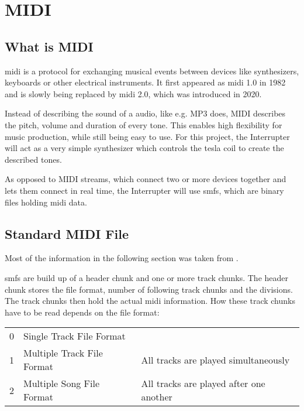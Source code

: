 \setchapterpreamble[u]{\margintoc}

\chapter{MIDI}

\section{What is MIDI}

\gls{midi} is a protocol for exchanging musical events between devices like synthesizers, keyboards or other electrical instruments. It first appeared as \gls{midi} 1.0 in 1982 and is slowly being replaced by \gls{midi} 2.0, which was introduced in 2020.

Instead of describing the sound of a audio, like e.g. MP3 does, MIDI describes the pitch, volume and duration of every tone. This enables high flexibility for music production, while still being easy to use. For this project, the Interrupter will act as a very simple synthesizer which controls the tesla coil to create the described tones.

As opposed to MIDI streams, which connect two or more devices together and lets them connect in real time, the Interrupter will use \glspl{smf}, which are binary files holding \gls{midi} data.

\section{Standard MIDI File}

Most of the information in the following section was taken from .

\glspl{smf} are build up of a header chunk and one or more track chunks. The header chunk stores the file format, number of following track chunks and the divisions. The track chunks then hold the actual \gls{midi} information. How these track chunks have to be read depends on the file format:

\begin{tabular}{cll}
    \midrule
    0 & Single Track File Format   & \\
    1 & Multiple Track File Format & All tracks are played simultaneously\\
    2 & Multiple Song File Format  & All tracks are played after one another\\
    \midrule
\end{tabular}

